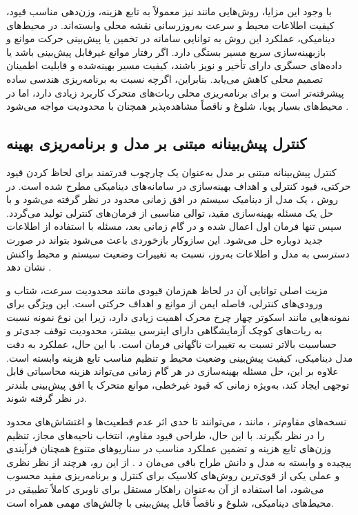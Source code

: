 با وجود این مزایا، روش‌هایی مانند  نیز معمولاً به تابع هزینه، وزن‌دهی مناسب قیود، کیفیت اطلاعات محیط و سرعت به‌روزرسانی نقشه محلی وابسته‌اند. در محیط‌های دینامیکی، عملکرد این روش به توانایی سامانه در تخمین یا پیش‌بینی حرکت موانع و بازبهینه‌سازی سریع مسیر بستگی دارد. اگر رفتار موانع غیرقابل پیش‌بینی باشد یا داده‌های حسگری دارای تأخیر و نویز باشند، کیفیت مسیر بهینه‌شده و قابلیت اطمینان تصمیم محلی کاهش می‌یابد. بنابراین، اگرچه  نسبت به برنامه‌ریزی هندسی ساده پیشرفته‌تر است و برای برنامه‌ریزی محلی ربات‌های متحرک کاربرد زیادی دارد، اما در محیط‌های بسیار پویا، شلوغ و ناقصاً مشاهده‌پذیر همچنان با محدودیت مواجه می‌شود %
\cite{LaValle2006Planning, Rosmann2013TEB,Rosmann2015TEB}.

\subsection{کنترل پیش‌بینانه مبتنی بر مدل و برنامه‌ریزی بهینه}

کنترل پیش‌بینانه مبتنی بر مدل%
به‌عنوان یک چارچوب قدرتمند برای لحاظ کردن قیود حرکتی، قیود کنترلی و اهداف بهینه‌سازی در سامانه‌های دینامیکی مطرح شده است. در روش ، یک مدل از دینامیک سیستم در افق زمانی محدود در نظر گرفته می‌شود و با حل یک مسئله بهینه‌سازی مقید، توالی مناسبی از فرمان‌های کنترلی تولید می‌گردد. سپس تنها فرمان اول اعمال شده و در گام زمانی بعد، مسئله با استفاده از اطلاعات جدید دوباره حل می‌شود. این سازوکار بازخوردی باعث می‌شود  بتواند در صورت دسترسی به مدل و اطلاعات به‌روز، نسبت به تغییرات وضعیت سیستم و محیط واکنش نشان دهد %
\cite{rawlings2009mpc,Bemporad1999}.

مزیت اصلی  توانایی آن در لحاظ هم‌زمان قیودی مانند محدودیت سرعت، شتاب و ورودی‌های کنترلی، فاصله ایمن از موانع و اهداف حرکتی است. این ویژگی برای نمونه‌هایی مانند اسکوتر چهار چرخ محرک اهمیت زیادی دارد، زیرا این نوع نمونه نسبت به ربات‌های کوچک آزمایشگاهی دارای اینرسی بیشتر، محدودیت توقف جدی‌تر و حساسیت بالاتر نسبت به تغییرات ناگهانی فرمان است. با این حال، عملکرد  به دقت مدل دینامیکی، کیفیت پیش‌بینی وضعیت محیط و تنظیم مناسب تابع هزینه وابسته است. علاوه بر این، حل مسئله بهینه‌سازی در هر گام زمانی می‌تواند هزینه محاسباتی قابل توجهی ایجاد کند، به‌ویژه زمانی که قیود غیرخطی، موانع متحرک یا افق پیش‌بینی بلندتر در نظر گرفته شوند.

نسخه‌های مقاوم‌تر ، مانند ، می‌توانند تا حدی اثر عدم قطعیت‌ها و اغتشاش‌های محدود را در نظر بگیرند. با این حال، طراحی قیود مقاوم، انتخاب ناحیه‌های مجاز، تنظیم وزن‌های تابع هزینه و تضمین عملکرد مناسب در سناریوهای متنوع همچنان فرآیندی پیچیده و وابسته به مدل و دانش طراح باقی می‌مان د%
\cite{Mayne2005TubeMPC}.
از این رو، هرچند  از نظر نظری و عملی یکی از قوی‌ترین روش‌های کلاسیک برای کنترل و برنامه‌ریزی مقید محسوب می‌شود، اما استفاده از آن به‌عنوان راهکار مستقل برای ناوبری کاملاً تطبیقی در محیط‌های دینامیکی، شلوغ و ناقصاً قابل پیش‌بینی با چالش‌های مهمی همراه است.

